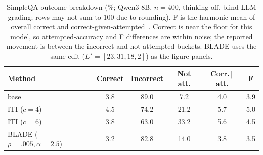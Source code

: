 \begin{table}[t]
\centering
\small
\begin{tabular}{@{}lccccc@{}}
\toprule
Method & Correct & Incorrect & Not att. & Corr.\,$\mid$\,att. & F \\
\midrule
base            & 3.8 & 89.0 &  7.2 & 4.0 & 3.9 \\
ITI ($c\!=\!4$) & 4.5 & 74.2 & 21.2 & 5.7 & 5.0 \\
ITI ($c\!=\!6$) & 3.8 & 63.0 & 33.2 & 5.6 & 4.5 \\
BLADE ($\rho\!=\!.005,\alpha\!=\!2.5$) & 3.2 & 82.8 & 14.0 & 3.8 & 3.5 \\
\bottomrule
\end{tabular}
\caption{SimpleQA outcome breakdown (\%; Qwen3-8B, $n\!=\!400$, thinking-off, blind LLM grading; rows
may not sum to $100$ due to rounding). F is the harmonic mean of overall correct and
correct-given-attempted~\citep{simpleqa}. Correct is near the floor for this model, so
attempted-accuracy and F differences are within noise; the reported movement is between the incorrect
and not-attempted buckets. BLADE uses the same edit ($L^\star\!=\![23,31,18,2]$) as the figure panels.}
\label{tab:simpleqa}
\end{table}
